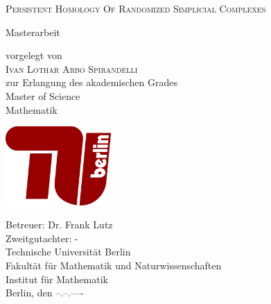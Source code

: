 \begin{titlepage}

\setlength{\hoffset}{.5cm}

 \begin{center}
 
    \large
    
    \renewcommand{\baselinestretch}{2}\normalsize
    
    {\huge \scshape Persistent Homology Of Randomized Simplicial Complexes}
    
    \renewcommand{\baselinestretch}{1}\normalsize
    
    \vspace*{.7cm}
    
    \huge{Masterarbeit}
    
    \vspace*{.7cm}
    
    \Large
    vorgelegt von\\
    \vspace*{.5cm}
     \huge{{\scshape Ivan Lothar Arbo Spirandelli}} \\
     \vspace*{.5cm}
    \Large
    zur Erlangung des akademischen Grades \\
  \vspace*{.5cm}
    \huge{Master of Science\\Mathematik}	
    
   
    
    \vspace*{.5cm}
    \large    
    \vspace*{1cm}
   \includegraphics[height=3cm]{TUBerlin_Logo_rot}
    \vspace*{1cm}
    
    Betreuer: Dr. Frank Lutz \\[1ex]
    Zweitgutachter: - \\[3ex]
    
   Technische Universit\"at Berlin\\
   
   Fakult\"at f\"ur Mathematik und Naturwissenschaften\\
   
   Institut f\"ur Mathematik\\[7ex]
   
       Berlin, den --.--.----
   
  \end{center}
\end{titlepage}
\newpage
\thispagestyle{empty}
\qquad

